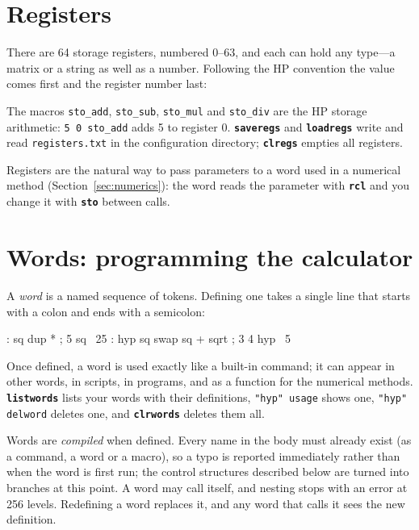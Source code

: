 \documentclass[11pt,letterpaper]{article}
\newcommand{\code}[1]{\texttt{#1}}
\newcommand{\cmd}[1]{\texttt{\textbf{#1}}}
\begin{document}
\section{Registers}

There are 64 storage registers, numbered 0--63, and each can hold any type---a matrix or a string as well as a number. Following the HP convention the value comes first and the register number last:
The macros \code{sto\_add}, \code{sto\_sub}, \code{sto\_mul} and \code{sto\_div} are the HP storage arithmetic: \code{5 0 sto\_add} adds 5 to register 0. \cmd{saveregs} and \cmd{loadregs} write and read \code{registers.txt} in the configuration directory; \cmd{clregs} empties all registers.

Registers are the natural way to pass parameters to a word used in a numerical method (Section~\ref{sec:numerics}): the word reads the parameter with \cmd{rcl} and you change it with \cmd{sto} between calls.

\section{Words: programming the calculator}
\label{sec:words}

A \emph{word} is a named sequence of tokens. Defining one takes a single line that starts with a colon and ends with a semicolon:
\begin{rpn}
: sq dup * ;
5 sq                 \ 25
: hyp sq swap sq + sqrt ;
3 4 hyp              \ 5
\end{rpn}
Once defined, a word is used exactly like a built-in command; it can appear in other words, in scripts, in programs, and as a function for the numerical methods. \cmd{listwords} lists your words with their definitions, \code{"hyp" usage} shows one, \code{"hyp" delword} deletes one, and \cmd{clrwords} deletes them all.

Words are \emph{compiled} when defined. Every name in the body must already exist (as a command, a word or a macro), so a typo is reported immediately rather than when the word is first run; the control structures described below are turned into branches at this point. A word may call itself, and nesting stops with an error at 256 levels. Redefining a word replaces it, and any word that calls it sees the new definition.
\end{document}

